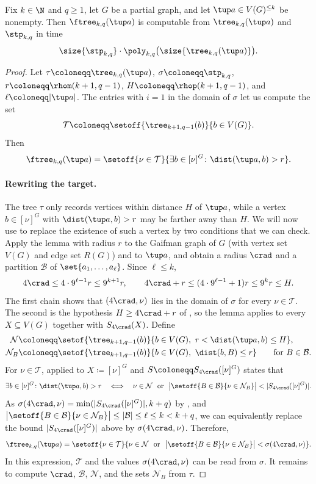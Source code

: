\begin{lemma}\label{lem:to-ftree}
Fix $k\in\N$ and $q\ge1$, let $G$ be a partial graph, and let $\tup a\in V(G)^{\le k}$ be nonempty.
Then $\ftree_{k,q}(\tup a)$ is computable from $\tree_{k,q}(\tup a)$ and $\stp_{k,q}$ in time
\[
\size{\stp_{k,q}}\cdot
\poly_{k,q}\bigl(\size{\tree_{k,q}(\tup a)}\bigr).
\]
\end{lemma}
\begin{proof}
Let
$\tau\coloneqq\tree_{k,q}(\tup a)$,
$\sigma\coloneqq\stp_{k,q}$,
$r\coloneqq\rhom(k+1,q-1)$,
$H\coloneqq\rhop(k+1,q-1)$, and
$\ell\coloneqq|\tup a|$.
The entries with $i=1$ in the domain of $\sigma$ let us compute the set
\[
\mathcal T
\coloneqq
\setoff{\tree_{k+1,q-1}(b)}{b\in V(G)}.
\]
Then
\[
\ftree_{k,q}(\tup a) =\setoff{\nu\in\mathcal T}{\exists b\in[\nu]^G\colon\dist(\tup a,b)>r}.
\]

\paragraph{Rewriting the target.}
The tree $\tau$ only records vertices within distance $H$ of $\tup a$, while a vertex $b\in[\nu]^G$ with $\dist(\tup a,b)>r$ may be farther away than $H$.
We will now use  to replace the existence of such a vertex by two conditions that we can check.
Apply the lemma with radius $r$ to the Gaifman graph of $G$ (with vertex set $V(G)$ and edge set $R(G)$) and to $\tup a$, and obtain a radius $\crad$ and a partition $\mathcal B$ of $\set{a_1,\ldots,a_\ell}$.
Since $\ell\le k$,
\[
4\crad\le4\cdot9^{\ell-1}r\le9^{k+1}r,
\qquad
4\crad+r\le(4\cdot9^{\ell-1}+1)r\le9^{k}r\le H.
\]
The first chain shows that $(4\crad,\nu)$ lies in the domain of $\sigma$ for every $\nu\in\mathcal T$. The second is the hypothesis $H\ge4\crad+r$ of , so the lemma applies to every $X\subseteq V(G)$ together with $S_{4\crad}(X)$.
Define
\begin{align*}
\mathcal N&\coloneqq\setof{\tree_{k+1,q-1}(b)}{b\in V(G),\ r<\dist(\tup a,b)\le H},\\
\mathcal N_B&\coloneqq\setof{\tree_{k+1,q-1}(b)}{b\in V(G),\ \dist(b,B)\le r}
\qquad\text{for $B\in\mathcal B$.}
\end{align*}
For $\nu\in\mathcal T$,  applied to $X\coloneqq[\nu]^G$ and $S\coloneqq S_{4\crad}([\nu]^G)$ states that
\[
\exists b\in[\nu]^G\colon\dist(\tup a,b)>r
\quad\Longleftrightarrow\quad
\nu\in\mathcal N\ \text{ or }\ \bigl|\setoff{B\in\mathcal B}{\nu\in\mathcal N_B}\bigr|<|S_{4\crad}([\nu]^G)|.
\]
As $\sigma(4\crad,\nu)=\min(|S_{4\crad}([\nu]^G)|,k+q)$ by , and $\bigl|\setoff{B\in\mathcal B}{\nu\in\mathcal N_B}\bigr|\le|\mathcal B|\le\ell\le k<k+q$, we can equivalently replace the bound $|S_{4\crad}([\nu]^G)|$ above by $\sigma(4\crad,\nu)$.
Therefore,
\[
\ftree_{k,q}(\tup a)
=\setoff{\nu\in\mathcal T}{\nu\in\mathcal N\ \text{ or }\ \bigl|\setoff{B\in\mathcal B}{\nu\in\mathcal N_B}\bigr|<\sigma(4\crad,\nu)}.
\]
In this expression, $\mathcal T$ and the values $\sigma(4\crad,\nu)$ can be read from $\sigma$.
It remains to compute $\crad$, $\mathcal B$, $\mathcal N$, and the sets $\mathcal N_B$ from $\tau$.


\end{proof}

